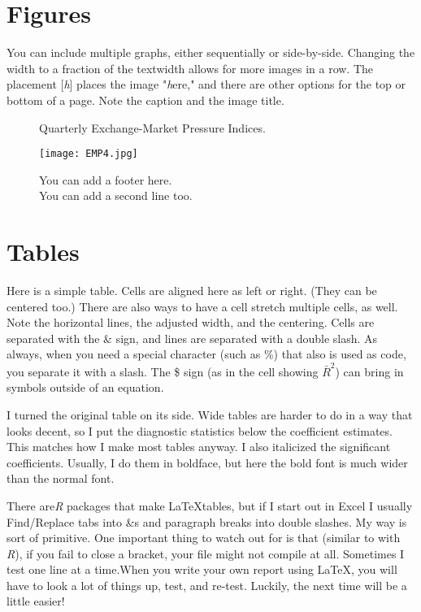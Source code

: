 \documentclass[letterpaper]{article}
\begin{document}
\section{Figures}
You can include multiple graphs, either sequentially or side-by-side. Changing the width to a fraction of the textwidth allows for more images in a row. The placement [\textit{h}] places the image "\textit{h}ere," and there are other options for the top or bottom of a page. Note the caption and the image title.

\begin{figure}[h]
\hfill

\caption{Quarterly Exchange-Market Pressure Indices.}
\texttt{[image: EMP4.jpg]}

\caption*{You can add a footer here.\\
You can add a second line too.
}
\end{figure}

\section{Tables}

Here is a simple table. Cells are aligned here as left or right. (They can be centered too.) There are also ways to have a cell stretch multiple cells, as well. Note the horizontal lines, the adjusted width, and the centering. Cells are separated with the \& sign, and lines are separated with a double slash. As always, when you need a special character (such as \%) that also is used as code, you separate it with a slash. The \$ sign (as in the cell showing $\bar{R}^2$) can bring in symbols outside of an equation.

I turned the original table on its side. Wide tables are harder to do in a way that looks decent, so I put the diagnostic statistics below the coefficient estimates. This matches how I make most tables anyway. I also italicized the significant coefficients. Usually, I do them in boldface, but here the bold font is much wider than the normal font. 

There are\textit{R} packages that make \LaTeX tables, but if I start out in Excel I usually Find/Replace tabs into \&s and paragraph breaks into double slashes. My way is sort of primitive. One important thing to watch out for is  that (similar to with \textit{R}), if you fail to close a bracket, your file might not compile at all. Sometimes I test one line at a time.When you write your own report using \LaTeX, you will have to look a lot of things up, test, and re-test. Luckily, the next time will be a little easier!
\end{document}
